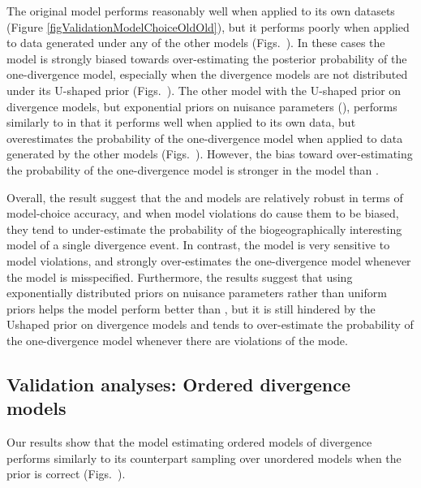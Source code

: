 \documentclass[letterpaper,12pt]{article}
\begin{document}
\begin{linenumbers}
The original \msb model \modelOld performs reasonably well when applied
to its own datasets (Figure \ref{figValidationModelChoiceOldOld}), but
it performs poorly when applied to data generated under any of the other
models (Figs.\
).
In these cases the \modelOld model is strongly biased towards over-estimating
the posterior probability of the one-divergence model, especially when the
divergence models are not distributed under its U-shaped prior (Figs.\
).
The other model with the U-shaped prior on divergence models, but exponential
priors on nuisance parameters (\modelUshaped), performs similarly to \modelOld
in that it performs well when applied to its own data, but overestimates
the probability of the one-divergence model when applied to data generated
by the other models (Figs.\
).
However, the bias toward over-estimating the probability of the one-divergence
model is stronger in the \modelOld model than \modelUshaped.

Overall, the result suggest that the \modelDPP and \modelUniform models are
relatively robust in terms of model-choice accuracy, and when model violations
do cause them to be biased, they tend to under-estimate the probability of
the biogeographically interesting model of a single divergence event.
In contrast, the \modelOld model is very sensitive to model violations,
and strongly over-estimates the one-divergence model whenever the model
is misspecified.
Furthermore, the results suggest that using exponentially distributed priors on
nuisance parameters rather than uniform priors helps the \modelUshaped model
perform better than \modelOld, but it is still hindered by the Ushaped prior on
divergence models and tends to over-estimate the probability of the
one-divergence model whenever there are violations of the mode.


\subsection*{Validation analyses: Ordered divergence models}
Our results show that the model estimating ordered models of divergence
\modelDPPOrdered performs similarly to its counterpart sampling over
unordered models \modelDPP when the prior is correct (Figs.\
).


\end{linenumbers}
\end{document}
